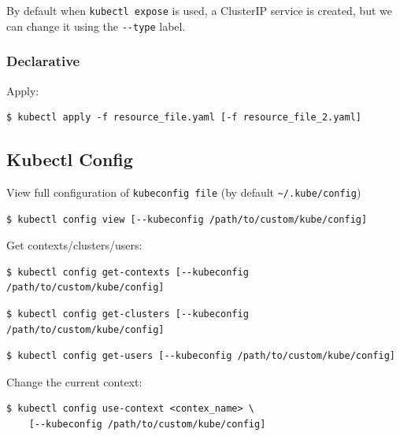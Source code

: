 \documentclass{article}
\newenvironment{blocktemplate}[1]{%
    \tcolorbox[beamer,%
    noparskip,breakable,
    colframe=Blue,%
    colbacklower=LimeGreen!75!LightGreen,%
    title=#1]}%
    {\endtcolorbox}
\newenvironment{codetemplate}[1][]{%
  \mybasecolorbox[#1]
  \itshape
}{%
  \endmybasecolorbox
}
\begin{document}
\begin{blocktemplate}{NOTE}
By default when \verb|kubectl expose| is used, a ClusterIP service is created, but we can change it using the \verb|--type| label.
\end{blocktemplate}

\subsubsection{Declarative}
Apply:
\begin{codetemplate}
\begin{verbatim}
$ kubectl apply -f resource_file.yaml [-f resource_file_2.yaml]
\end{verbatim}
\end{codetemplate}

\subsection{Kubectl Config}
View full configuration of \verb|kubeconfig file| (by default \verb|~/.kube/config|)
\begin{codetemplate}
\begin{verbatim}
$ kubectl config view [--kubeconfig /path/to/custom/kube/config]
\end{verbatim}
\end{codetemplate}

Get contexts/clusters/users:
\begin{codetemplate}
\begin{verbatim}
$ kubectl config get-contexts [--kubeconfig /path/to/custom/kube/config]
\end{verbatim}
\end{codetemplate}
\begin{codetemplate}
\begin{verbatim}
$ kubectl config get-clusters [--kubeconfig /path/to/custom/kube/config]
\end{verbatim}
\end{codetemplate}
\begin{codetemplate}
\begin{verbatim}
$ kubectl config get-users [--kubeconfig /path/to/custom/kube/config]
\end{verbatim}
\end{codetemplate}

Change the current context:
\begin{codetemplate}
\begin{verbatim}
$ kubectl config use-context <contex_name> \
    [--kubeconfig /path/to/custom/kube/config]
\end{verbatim}
\end{codetemplate}
\end{document}
